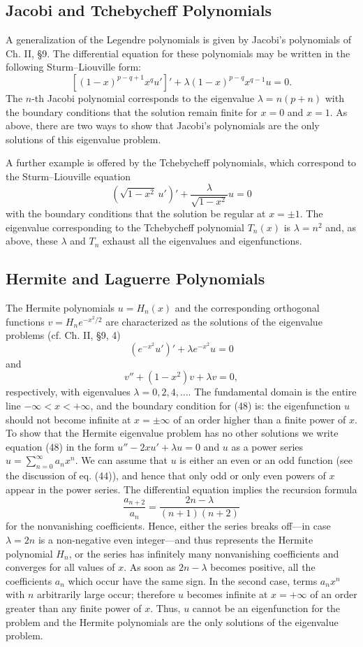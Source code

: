 \subsection{Jacobi and Tchebycheff Polynomials}
A generalization of the Legendre polynomials is given by Jacobi's polynomials of Ch. II, \S9. The differential equation for these polynomials may be written in the following Sturm--Liouville form:
\[
[(1-x)^{p-q+1}x^q u']'+\lambda(1-x)^{p-q}x^{q-1}u=0.
\]
The $n$-th Jacobi polynomial corresponds to the eigenvalue $\lambda=n(p+n)$ with the boundary conditions that the solution remain finite for $x=0$ and $x=1$. As above, there are two ways to show that Jacobi's polynomials are the only solutions of this eigenvalue problem.

A further example is offered by the Tchebycheff polynomials, which correspond to the Sturm--Liouville equation
\[
(\sqrt{1-x^2}\,u')'+\frac{\lambda}{\sqrt{1-x^2}}u=0
\]
with the boundary conditions that the solution be regular at $x=\pm1$. The eigenvalue corresponding to the Tchebycheff polynomial $T_n(x)$ is $\lambda=n^2$ and, as above, these $\lambda$ and $T_n$ exhaust all the eigenvalues and eigenfunctions.

\subsection{Hermite and Laguerre Polynomials}
The Hermite polynomials $u=H_n(x)$ and the corresponding orthogonal functions $v=H_ne^{-x^2/2}$ are characterized as the solutions of the eigenvalue problems (cf. Ch. II, \S9, 4)
\begin{equation}
(e^{-x^2}u')'+\lambda e^{-x^2}u=0
\tag{48}
\end{equation}
and
\begin{equation}
v''+(1-x^2)v+\lambda v=0,
\tag{49}
\end{equation}
respectively, with eigenvalues $\lambda=0,2,4,\ldots$. The fundamental domain is the entire line $-\infty<x<+\infty$, and the boundary condition for (48) is: the eigenfunction $u$ should not become infinite at $x=\pm\infty$ of an order higher than a finite power of $x$. To show that the Hermite eigenvalue problem has no other solutions we write equation (48) in the form $u''-2xu'+\lambda u=0$ and $u$ as a power series $u=\sum_{n=0}^{\infty}a_nx^n$. We can assume that $u$ is either an even or an odd function (see the discussion of eq. (44)), and hence that only odd or only even powers of $x$ appear in the power series. The differential equation implies the recursion formula
\[
\frac{a_{n+2}}{a_n}=\frac{2n-\lambda}{(n+1)(n+2)}
\]
for the nonvanishing coefficients. Hence, either the series breaks off---in case $\lambda=2n$ is a non-negative even integer---and thus represents the Hermite polynomial $H_n$, or the series has infinitely many nonvanishing coefficients and converges for all values of $x$. As soon as $2n-\lambda$ becomes positive, all the coefficients $a_n$ which occur have the same sign. In the second case, terms $a_nx^n$ with $n$ arbitrarily large occur; therefore $u$ becomes infinite at $x=+\infty$ of an order greater than any finite power of $x$. Thus, $u$ cannot be an eigenfunction for the problem and the Hermite polynomials are the only solutions of the eigenvalue problem.

